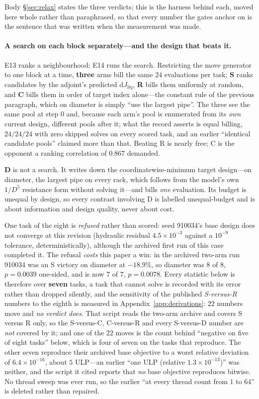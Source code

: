 \documentclass{article}
\newcommand{\Jliq}{J_{\mathrm{liq}}}
\begin{document}
Body \S\ref{sec:relax} states the three verdicts; this is the harness behind each,
moved here whole rather than paraphrased, so that every number the gates anchor on is
the sentence that was written when the measurement was made.

\paragraph{A search on each block separately---and the design that beats it.}
E13 ranks a neighbourhood; E14 runs the search.  Restricting the move generator to one
block at a time, \textbf{three} arms bill the same $24$ evaluations per task:
\textbf{S} ranks candidates by the adjoint's predicted
$\mathrm{d}\Jliq$, \textbf{R} bills them uniformly at random, and \textbf{C} bills them in
order of target index alone---the constant rule of the previous paragraph, which on
diameter is simply ``use the largest pipe''.  The three see the same pool at step $0$ and,
because each arm's pool is enumerated from its \emph{own} current design, different pools
after it; what the record asserts is equal billing, $24/24/24$ with zero skipped solves on
every scored task, and an earlier ``identical candidate pools'' claimed more than that.
Beating R is nearly free; C is the opponent a ranking correlation of $0.867$ demanded.

\textbf{D} is not a search.  It writes down the coordinatewise-minimum target design---on
diameter, the largest pipe on every rack, which follows from the model's own $1/D^5$
resistance form without solving it---and bills \emph{one} evaluation.  Its budget is
unequal by design, so every contrast involving D is labelled unequal-budget and is about
information and design quality, never about cost.

One task of the eight is \emph{refused} rather than scored: seed 910034's base design does
not converge at this revision (hydraulic residual $4.5\times10^{-3}$ against a $10^{-9}$
tolerance, deterministically), although the
archived first run of this case completed it.  The refusal \emph{costs} this paper a win:
in the archived two-arm run 910034 was an S victory on diameter at $-18.9\%$, so diameter
was $8$ of $8$, $p = 0.0039$ one-sided, and is now $7$ of $7$, $p = 0.0078$.  Every
statistic below is therefore over \textbf{seven} tasks, a task that cannot solve is
recorded with its error rather than dropped silently, and the sensitivity of the published
\emph{S-versus-R} numbers to the eighth is measured in
Appendix~\ref{app:derivations}: $22$ numbers move and \emph{no verdict does}.  That script
reads the two-arm archive and covers S versus R only, so the S-versus-C, C-versus-R and
every S-versus-D number are \emph{not} covered by it; and one of the $22$ moves is the
count behind ``negative on five of eight tasks'' below, which is four of seven on the
tasks that reproduce.  The other seven reproduce their archived base objective to a worst
relative deviation of $6.4\times10^{-16}$, about $5$ ULP---an earlier ``one ULP (relative
$1.3\times10^{-13}$)'' was neither, and the script it cited reports that \emph{no} base
objective reproduces bitwise.  No thread sweep was ever run, so the earlier ``at every
thread count from $1$ to $64$'' is deleted rather than repaired.
\end{document}
